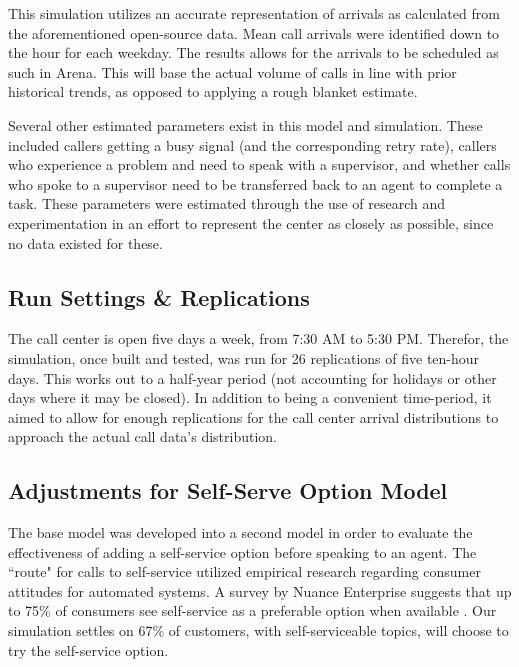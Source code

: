 \documentclass[12pt,twocolumn]{article}
\begin{document}
	
	This simulation utilizes an accurate representation of arrivals as calculated from the aforementioned open-source data.  Mean call arrivals were identified down to the hour for each weekday.  The results allows for the arrivals to be scheduled as such in Arena.  This will base the actual volume of calls in line with prior historical trends, as opposed to applying a rough blanket estimate.
	
	\par
	
	Several other estimated parameters exist in this model and simulation.  These included callers getting a busy signal (and the corresponding retry rate), callers who experience a problem and need to speak with a supervisor, and whether calls who spoke to a supervisor need to be transferred back to an agent to complete a task.  These parameters were estimated through the use of research and experimentation in an effort to represent the center as closely as possible, since no data existed for these.
	
	\subsection{Run Settings \& Replications}
	
	 The call center is open five days a week, from 7:30 AM to 5:30 PM.  Therefor, the simulation, once built and tested, was run for 26 replications of five ten-hour days.  This works out to a half-year period (not accounting for holidays or other days where it may be closed).  In addition to being a convenient time-period, it aimed to allow for enough replications for the call center arrival distributions to approach the actual call data's distribution.
	 
	 
	\subsection{Adjustments for Self-Serve Option Model}
	
	The base model was developed into a second model in order to evaluate the effectiveness of adding a self-service option before speaking to an agent.  The ``route" for calls to self-service utilized empirical research regarding consumer attitudes for automated systems.  A survey by Nuance Enterprise suggests that up to 75\% of consumers see self-service as a preferable option when available \cite{webblog}.  Our simulation settles on 67\% of customers, with self-serviceable topics, will choose to try the self-service option.  
\end{document}
